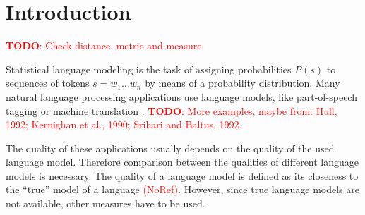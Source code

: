 \documentclass[11pt,a4paper]{article}
\title{\mytitle}
\author{
  \myname \\
  \small{\myaddress} \\
  \small{\texttt{\href{mailto:\mymail}{\nolinkurl{\mymail}}}}
}
\date{\today}
\newcommand{\probSymbol}[1][]{P_{#1}}
\newcommand{\prob}[2][]{\probSymbol[#1](#2)}
\newcommand{\todo}[1]{\textcolor{red}{\textbf{TODO}: #1}}
\newcommand{\noref}{\textcolor{red}{(NoRef)}}
\begin{document}
\maketitle

\begin{abstract}
  The quality of a language model is commonly measured with the entropy of its
  probability distribution.
  However it is not clear whether language models that score better entropy
  actually perform better in a given application.
  Applications' usage of language models can usually be represented as an
  argmax query.
  However argmax computation is a very time intensive operation, and therefore
  no practicable measure of language model quality.
  This thesis will research how to efficiently compute argmax queries and
  thus be able to present a measure of quality that is closer to actual
  applications.
  It will then explore how this measure compares to entropy.
\end{abstract}

\section{Introduction}

\todo{Check distance, metric and measure.}

Statistical language modeling is the task of assigning probabilities $\prob{s}$
to sequences of tokens ${s = w_1 \ldots w_n}$ by means of a
probability distribution.
Many natural language processing applications use language models, like
part-of-speech tagging or machine translation \parencite{Church1988,Brown1990}.
\todo{More examples, maybe from: Hull, 1992; Kernighan et al., 1990;
Srihari and Baltus, 1992.}

The quality of these applications usually depends on the quality of the used
language model.
Therefore comparison between the qualities of different language models is
necessary.
The quality of a language model is defined as its closeness to the ``true''
model of a language \noref.
However, since true language models are not available, other measures have to be
used.
\end{document}
